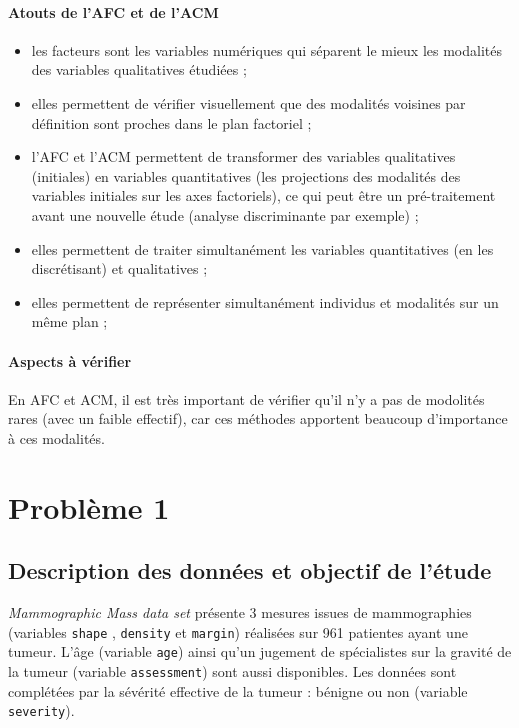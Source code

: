 \documentclass[a4paper]{report}
\begin{document}
\subsubsection{Atouts de l'AFC et de l'ACM}
\begin{itemize}
 \item les facteurs sont les variables numériques qui séparent le mieux les modalités des variables qualitatives étudiées ;
 \item elles permettent de vérifier visuellement que des modalités voisines par définition sont proches dans le plan factoriel ;
 \item l'AFC et l'ACM permettent de transformer des variables qualitatives (initiales) en variables quantitatives (les projections des modalités des variables initiales sur les axes factoriels), ce qui peut être un pré-traitement avant une nouvelle étude (analyse discriminante par exemple) ;
 \item elles permettent de traiter simultanément les variables quantitatives (en les discrétisant) et qualitatives ; 
 \item elles permettent de représenter simultanément individus et modalités sur un même plan ;
 \end{itemize}
 
 \subsubsection{Aspects à vérifier}
 En AFC et ACM, il est très important de vérifier qu'il n'y a pas de modolités rares (avec un faible effectif), car ces méthodes apportent beaucoup d'importance à ces modalités. 
 
 
 \chapter{Problème 1}
 
\section{Description des données et objectif de l'étude}

\emph{Mammographic Mass data set} présente 3 mesures issues de mammographies (variables \verb|shape| , \verb|density| et \verb|margin|) réalisées sur 961 patientes ayant une tumeur. L'âge (variable \verb|age|) ainsi qu'un jugement de spécialistes sur la gravité de la tumeur (variable \verb|assessment|) sont aussi disponibles. Les données sont complétées par la sévérité effective de la tumeur : bénigne ou non (variable \verb|severity|).
\end{document}

